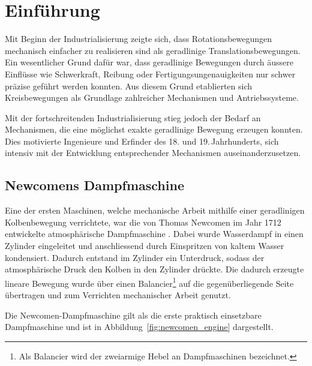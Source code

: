 %
%
%
%
\section{Einführung\label{geradlinig:section:einfuehrung}}
Mit Beginn der Industrialisierung zeigte sich, dass Rotationsbewegungen
mechanisch einfacher zu realisieren sind als geradlinige
Translationsbewegungen. Ein wesentlicher Grund dafür war, dass
geradlinige Bewegungen durch äussere Einflüsse wie Schwerkraft,
Reibung oder Fertigungsungenauigkeiten nur schwer präzise geführt
werden konnten. Aus diesem Grund etablierten sich Kreisbewegungen als
Grundlage zahlreicher Mechanismen und Antriebssysteme.
%
%
%
%
%

Mit der fortschreitenden Industrialisierung stieg jedoch der Bedarf an
Mechanismen, die eine möglichst exakte geradlinige Bewegung erzeugen
konnten. Dies motivierte Ingenieure und Erfinder des 18. und
19.\,Jahrhunderts, sich intensiv mit der Entwicklung entsprechender
Mechanismen auseinanderzusetzen.

\subsection{Newcomens Dampfmaschine\label{geradlinig:subsection:newcomen}}
Eine der ersten Maschinen, welche mechanische Arbeit mithilfe einer
geradlinigen Kolbenbewegung verrichtete, war die von Thomas Newcomen im
%
Jahr 1712 entwickelte atmosphärische Dampfmaschine
%
\cite{wiki_newcomen}. Dabei wurde Wasserdampf in einen Zylinder
eingeleitet und anschliessend durch Einspritzen von kaltem Wasser
kondensiert. Dadurch entstand im Zylinder ein Unterdruck, sodass der
atmosphärische Druck den Kolben in den Zylinder drückte. Die dadurch
erzeugte lineare Bewegung wurde über 
einen Balancier\footnote{Als Balancier wird der zweiarmige Hebel an 
Dampfmaschinen bezeichnet.}
auf die gegenüberliegende Seite übertragen und zum Verrichten mechanischer
Arbeit genutzt.

Die Newcomen-Dampfmaschine gilt als die erste praktisch einsetzbare
Dampfmaschine und ist in Abbildung~\ref{fig:newcomen_engine}
dargestellt.


